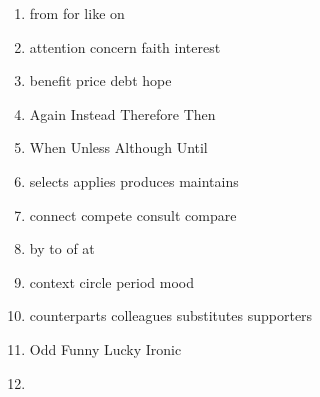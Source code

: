 \begin{enumerate}
	\item

\fourchoices
{from}
{for}
{like}
{on}



\item

\fourchoices
{attention}
{concern}
{faith}
{interest}



\item

\fourchoices
{benefit}
{price}
{debt}
{hope}


\item

\fourchoices
{Again}
{Instead}
{Therefore}
{Then}



\item

\fourchoices
{When}
{Unless}
{Although}
{Until}


\item

\fourchoices
{selects}
{applies}
{produces}
{maintains}



\item

\fourchoices
{connect}
{compete}
{consult}
{compare}



\item

\fourchoices
{by}
{to}
{of}
{at}


\item

\fourchoices
{context}
{circle}
{period}
{mood}



\item

\fourchoices
{counterparts}
{colleagues}
{substitutes}
{supporters}



\item

\fourchoices
{Odd}
{Funny}
{Lucky}
{Ironic}


\item


\end{enumerate}
